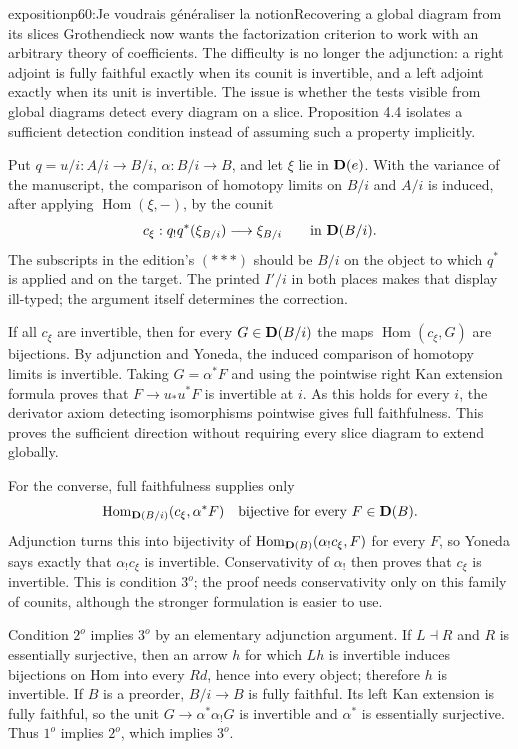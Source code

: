 \begin{dcomment}{exposition}{p60:Je voudrais généraliser la notion}{Recovering a global diagram from its slices}
Grothendieck now wants the factorization criterion to work with an arbitrary theory of coefficients. The difficulty is no longer the adjunction: a right adjoint is fully faithful exactly when its counit is invertible, and a left adjoint exactly when its unit is invertible. The issue is whether the tests visible from global diagrams detect every diagram on a slice. Proposition 4.4 isolates a sufficient detection condition instead of assuming such a property implicitly.

Put $q=u/i:A/i\to B/i$, $\alpha:B/i\to B$, and let $\xi$ lie in $\mathbf{D}(e)$. With the variance of the manuscript, the comparison of homotopy limits on $B/i$ and $A/i$ is induced, after applying $\operatorname{Hom}(\xi,-)$, by the counit
\[
 c_\xi:q_!q^*(\xi_{B/i})\longrightarrow\xi_{B/i}
 \qquad\hbox{in }\mathbf{D}(B/i).
\]
The subscripts in the edition's $(***)$ should be $B/i$ on the object to which $q^*$ is applied and on the target. The printed $I'/i$ in both places makes that display ill-typed; the argument itself determines the correction.

If all $c_\xi$ are invertible, then for every $G\in\mathbf{D}(B/i)$ the maps $\operatorname{Hom}(c_\xi,G)$ are bijections. By adjunction and Yoneda, the induced comparison of homotopy limits is invertible. Taking $G=\alpha^*F$ and using the pointwise right Kan extension formula proves that $F\to u_*u^*F$ is invertible at $i$. As this holds for every $i$, the derivator axiom detecting isomorphisms pointwise gives full faithfulness. This proves the sufficient direction without requiring every slice diagram to extend globally.

For the converse, full faithfulness supplies only
\[
 \operatorname{Hom}_{\mathbf{D}(B/i)}(c_\xi,\alpha^*F)
 \quad\hbox{bijective for every }F\in\mathbf{D}(B).
\]
Adjunction turns this into bijectivity of $\operatorname{Hom}_{\mathbf{D}(B)}(\alpha_!c_\xi,F)$ for every $F$, so Yoneda says exactly that $\alpha_!c_\xi$ is invertible. Conservativity of $\alpha_!$ then proves that $c_\xi$ is invertible. This is condition $3^o$; the proof needs conservativity only on this family of counits, although the stronger formulation is easier to use.

Condition $2^o$ implies $3^o$ by an elementary adjunction argument. If $L\dashv R$ and $R$ is essentially surjective, then an arrow $h$ for which $Lh$ is invertible induces bijections on Hom into every $Rd$, hence into every object; therefore $h$ is invertible. If $B$ is a preorder, $B/i\to B$ is fully faithful. Its left Kan extension is fully faithful, so the unit $G\to\alpha^*\alpha_!G$ is invertible and $\alpha^*$ is essentially surjective. Thus $1^o$ implies $2^o$, which implies $3^o$.


\end{dcomment}
